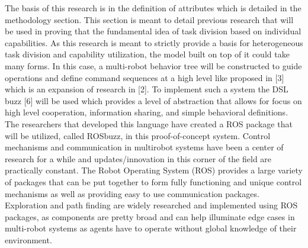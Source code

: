 The basis of this research is in the definition of attributes which is detailed
in the methodology section. This section is meant to detail previous research
that will be used in proving that the fundamental idea of task division based
on individual capabilities. As this research is meant to strictly provide a basis
for heterogeneous task division and capability utilization, the model built on
top of it could take many forms. In this case, a multi-robot behavior tree will
be constructed to guide operations and define command sequences at a high level like
proposed in [3] which is an expansion of research in [2]. To implement such a
system the DSL buzz [6] will be used which provides a level of abstraction that
allows for focus on high level cooperation, information sharing, and simple
behavioral definitions. The researchers that developed this language have created a
ROS package that will be utilized, called ROSbuzz, in this proof-of-concept system.
Control mechanisms and communication in multirobot systems have been a center of
research for a while and updates/innovation in this corner of the field are practically
constant. The Robot Operating System (ROS) \cite{ROS} provides a large variety of packages
that can be put together to form fully functioning and unique control mechanisms as
well as providing easy to use communication packages. Exploration and path finding
are widely researched and implemented using ROS packages, as components are pretty
broad and can help illuminate edge cases in multi-robot systems as agents have to
operate without global knowledge of their environment.

